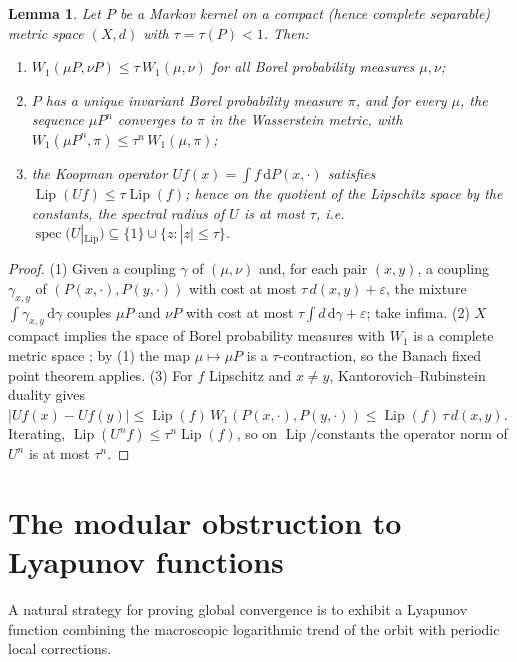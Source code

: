 \documentclass[11pt]{amsart}
\newtheorem{lemma}[theorem]{Lemma}
\theoremstyle{definition}
\theoremstyle{remark}
\newcommand{\Lip}{\operatorname{Lip}}
\newcommand{\dW}{W_1}
\begin{document}
\begin{lemma}\label{lem:dobrushin}
Let $P$ be a Markov kernel on a compact (hence complete separable) metric space $(X,d)$ with $\tau = \tau(P) < 1$. Then:
\begin{enumerate}
\item $\dW(\mu P, \nu P) \le \tau\, \dW(\mu,\nu)$ for all Borel probability measures $\mu,\nu$;
\item $P$ has a unique invariant Borel probability measure $\pi$, and for every $\mu$, the sequence $\mu P^n$ converges to $\pi$ in the Wasserstein metric, with $\dW(\mu P^n, \pi) \le \tau^n\, \dW(\mu, \pi)$;
\item the Koopman operator $Uf(x) = \int f\,\mathrm{d}P(x,\cdot)$ satisfies $\Lip(Uf) \le \tau \Lip(f)$; hence on the quotient of the Lipschitz space by the constants, the spectral radius of $U$ is at most $\tau$, i.e.\ $\operatorname{spec}\bigl(U|_{\Lip}\bigr) \subseteq \{1\} \cup \{z : |z| \le \tau\}$.
\end{enumerate}
\end{lemma}

\begin{proof}
(1) Given a coupling $\gamma$ of $(\mu,\nu)$ and, for each pair $(x,y)$, a coupling $\gamma_{x,y}$ of $(P(x,\cdot), P(y,\cdot))$ with cost at most $\tau\, d(x,y) + \varepsilon$, the mixture $\int \gamma_{x,y}\, \mathrm{d}\gamma$ couples $\mu P$ and $\nu P$ with cost at most $\tau \int d \,\mathrm{d}\gamma + \varepsilon$; take infima. (2) $X$ compact implies the space of Borel probability measures with $\dW$ is a complete metric space \cite[Thm.~6.18]{villani2009}; by (1) the map $\mu \mapsto \mu P$ is a $\tau$-contraction, so the Banach fixed point theorem applies. (3) For $f$ Lipschitz and $x \neq y$, Kantorovich--Rubinstein duality \cite[Ch.~5]{villani2009} gives $|Uf(x) - Uf(y)| \le \Lip(f)\, \dW(P(x,\cdot), P(y,\cdot)) \le \Lip(f)\, \tau\, d(x,y)$. Iterating, $\Lip(U^n f) \le \tau^n \Lip(f)$, so on $\Lip/\text{constants}$ the operator norm of $U^n$ is at most $\tau^n$.
\end{proof}

\section{The modular obstruction to Lyapunov functions}\label{sec:main}

A natural strategy for proving global convergence is to exhibit a Lyapunov function combining the macroscopic logarithmic trend of the orbit with periodic local corrections.
\end{document}
